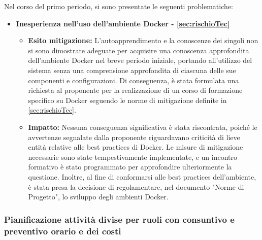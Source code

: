 \documentclass{article}
\begin{document}
Nel corso del primo periodo, si sono presentate le seguenti problematiche:
\begin{itemize}
    \item \textbf{Inesperienza nell'uso dell'ambiente Docker - \ref{sec:rischioTec}}
          \begin{itemize}
              \item \textbf{Esito mitigazione:}  L'autoapprendimento e la conoscenze dei singoli non si sono dimostrate adeguate per acquisire una conoscenza approfondita dell'ambiente Docker nel breve periodo iniziale,
                    portando all'utilizzo del sistema senza una comprensione approfondita di ciascuna delle sue componenti e configurazioni. Di conseguenza,
                    è stata formulata una richiesta al proponente per la realizzazione di un corso di formazione specifico su Docker seguendo le norme di mitigazione definite in \ref{sec:rischioTec}.
              \item \textbf{Impatto:} Nessuna conseguenza significativa è stata riscontrata, poiché le avvertenze segnalate dalla proponente riguardavano criticità di lieve entità relative alle best practices di Docker. Le misure di mitigazione necessarie sono state tempestivamente implementate, e un incontro formativo è stato programmato per approfondire ulteriormente la questione.
                    Inoltre, al fine di conformarsi alle best practices dell'ambiente, è stata presa la decisione di regolamentare, nel documento "Norme di Progetto", lo sviluppo degli ambienti Docker.
          \end{itemize}
\end{itemize}
\subsubsection*{Pianificazione attività divise per ruoli con consuntivo e preventivo orario e dei costi}
\end{document}
